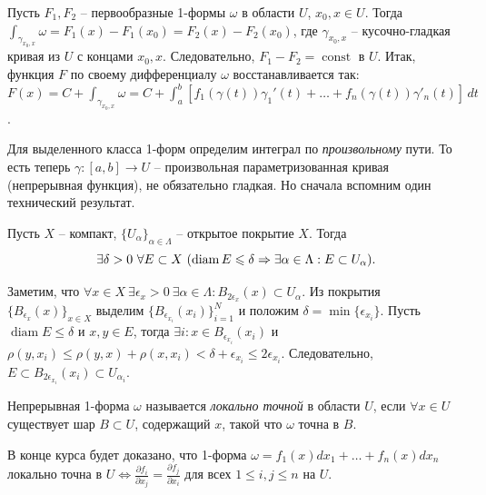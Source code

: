 \newpage

 \begin{note}
	Пусть $F_1, F_2$ -- первообразные 1-формы $\omega$ в области $U$, $x_0, x \in U$. 
	Тогда $\int_{\gamma_{x_0, x}} \omega = F_1 (x) - F_1(x_0) = F_2(x) - F_2(x_0)$, где $\gamma_{x_0, x}$ -- кусочно-гладкая кривая из $U$ с концами $x_0, x$.
	Следовательно, $F_1 - F_2 = \operatorname{const}$ в $U$.
	Итак, функция $F$ по своему дифференциалу $\omega$ восстанавливается так: $F(x) = C + \int_{\gamma_{x_0, x}} \omega = C + \int_{a}^{b} [ f_1(\gamma(t)) \gamma_1'(t) + \dotsc + f_n(\gamma(t)) \gamma'_n(t)] \, dt$.
 \end{note}

Для выделенного класса 1-форм определим интеграл по \textit{произвольному} пути.
То есть теперь $\gamma : [a, b] \to U$ -- произвольная параметризованная кривая (непрерывная функция), не обязательно гладкая.
Но сначала вспомним один технический результат.

 \begin{lemma}
	Пусть $X$ -- компакт, $\{U_{\alpha}\}_{\alpha \in \Lambda}$ -- открытое покрытие $X$. 
	Тогда 
	\[ \exists \delta > 0 \ \forall E \subset X \ ( \operatorname{diam} E \leqslant \delta \Rightarrow \exists \alpha \in \Lambda : E \subset U_{\alpha} ). \]
 \end{lemma}

 \begin{myproof}
	Заметим, что $\forall x \in X \ \exists \epsilon_x > 0 \ \exists \alpha \in \Lambda : B_{2 \epsilon_x}(x) \subset U_{\alpha}$. 
	Из покрытия $\{B_{\epsilon_x}(x)\}_{x \in X}$ выделим $\{B_{\epsilon_{x_i}}(x_i)\}_{i=1}^N$ и положим $\delta = \min \{\epsilon_{x_i}\}$.
	Пусть $\operatorname{diam} E \leq \delta$ и $x, y \in E$, тогда $\exists i : x \in B_{\epsilon_{x_i}}(x_i)$ и $\rho(y, x_i) \leq \rho(y, x) + \rho(x, x_i) < \delta + \epsilon_{x_i} \leq 2 \epsilon_{x_i}$. 
	Следовательно, $E \subset B_{2 \epsilon_{x_i}}(x_i) \subset U_{\alpha_i}$.
 \end{myproof}

\begin{definition}
	Непрерывная 1-форма $\omega$ называется \textit{локально точной} в области $U$, если $\forall x \in U$ существует шар $B \subset U$, содержащий $x$, такой что $\omega$ точна в $B$.
\end{definition}

\begin{note}
	В конце курса будет доказано, что 1-форма $\omega = f_1(x) dx_1 + \dotsc + f_n(x) dx_n$ локально точна в $U \iff \frac{\partial f_i}{\partial x_j} = \frac{\partial f_j}{\partial x_i}$ для всех $1 \leq i, j \leq n$ на $U$.
\end{note}


